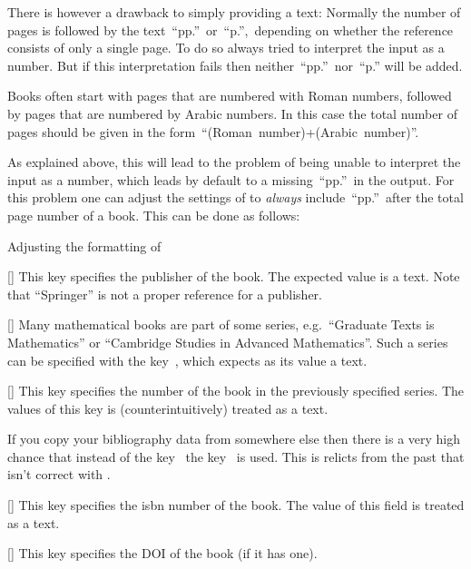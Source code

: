 \begin{mydescription}
    There is however a drawback to simply providing a text:
    Normally the number of pages is followed by the text~\enquote{pp.}\ or~\enquote{p.},\ depending on whether the reference consists of only a single page.
    To do so  always tried to interpret the input as a number.
    But if this interpretation fails then neither~\enquote{pp.}\ nor~\enquote{p.} will be added.

    Books often start with pages that are numbered with Roman numbers, followed by pages that are numbered by Arabic numbers.
    In this case the total number of pages should be given in the form~\enquote{(Roman~number)+(Arabic~number)}.

    As explained above, this will lead to the problem of  being unable to interpret the input as a number, which leads by default to a missing~\enquote{pp.}\ in the output.
    For this problem one can adjust the settings of  to \emph{always} include~\enquote{pp.}\ after the total page number of a book.
    This can be done as follows:
    \begin{showcode}{Adjusting the formatting of~}
    \end{showcode}
  \item[\optname{publisher}]
    [\optname]
    This key specifies the publisher of the book.
    The expected value is a text.
    Note that \enquote{Springer} is not a proper reference for a publisher.
  \item[\optname{series}]
    [\optname]
    Many mathematical books are part of some series, e.g.\ \enquote{Graduate Texts is Mathematics} or \enquote{Cambridge Studies in Advanced Mathematics}.
    Such a series can be specified with the key~, which expects as its value a text.
  \item[\optname{number}]
    [\optname]
    This key specifies the number of the book in the previously specified series.
    The values of this key is (counterintuitively) treated as a text.
    
    If you copy your bibliography data from somewhere else then there is a very high chance that instead of the key~ the key~ is used.
    This is relicts from the past that isn’t correct with .
  \item[\optname{isbn}]
    [\optname]
    This key specifies the isbn number of the book.
    The value of this field is treated as a text.
  \item[\optname{doi}]
    [\optname]
    This key specifies the DOI of the book (if it has one).
\end{mydescription}

